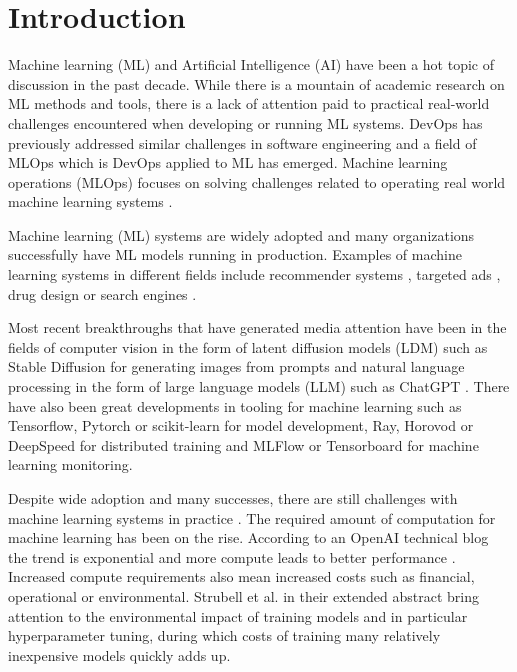 \chapter{Introduction}
\label{chap:intro}


Machine learning (ML) and Artificial Intelligence (AI) have been a hot topic of discussion in the past decade. While there is a mountain of academic research on ML methods and tools, there is a lack of attention paid to practical real-world challenges encountered when developing or running ML systems. DevOps has previously addressed similar challenges in software engineering and a field of MLOps which is DevOps applied to ML has emerged. Machine learning operations (MLOps) focuses on solving challenges related to operating real world machine learning systems \parencite{kreuzbergerMachineLearningOperations2023}.

Machine learning (ML) systems are widely adopted and many organizations successfully have ML models running in production.
Examples of machine learning systems in different fields include recommender systems , targeted ads \parencite{domingosFewUsefulThings2012}, drug design \parencite{domingosFewUsefulThings2012} or search engines \parencite{domingosFewUsefulThings2012}.

Most recent breakthroughs that have generated media attention have been in the fields of computer vision in the form of latent diffusion models (LDM) \parencite{rombachHighResolutionImageSynthesis2022} such as Stable Diffusion \parencite{stabilityaiStableDiffusionPublic2022} for generating images from prompts and natural language processing in the form of large language models (LLM) \parencite{touvronLLaMAOpenEfficient2023} such as ChatGPT \parencite{openaiIntroducingChatGPT2022}. There have also been great developments in tooling for machine learning such as Tensorflow, Pytorch or scikit-learn  for model development, Ray, Horovod or DeepSpeed  for distributed training and MLFlow or Tensorboard  for machine learning monitoring.


Despite wide adoption and many successes, there are still challenges with machine learning systems in practice . The required amount of computation for machine learning has been on the rise. According to an OpenAI technical blog the trend is exponential and more compute leads to better performance \parencite{amodeiAICompute2018}. Increased compute requirements also mean increased costs such as financial, operational or environmental. Strubell et al. \parencite*{strubellEnergyPolicyConsiderations2020} in their extended abstract bring attention to the environmental impact of training models and in particular hyperparameter tuning, during which costs of training many relatively inexpensive models quickly adds up.

